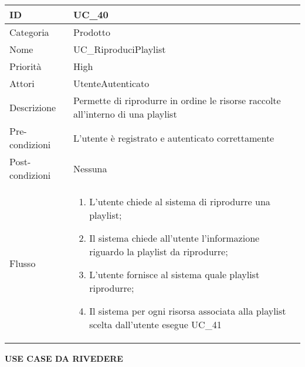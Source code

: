 \begin{center}
\begin{tabular}{ |p{2cm}|p{13cm}|  }
\hline
ID & UC\_40\\\hline
Categoria & Prodotto \\\hline
Nome & UC\_RiproduciPlaylist\\\hline
Priorità & High \\\hline
Attori &  UtenteAutenticato \\\hline
Descrizione & Permette di riprodurre in ordine le risorse raccolte all'interno di una playlist\\\hline
Pre-condizioni & L'utente è registrato e autenticato correttamente\\\hline
Post-condizioni & Nessuna\\\hline
Flusso &  	\begin{enumerate}
		\item L'utente chiede al sistema di riprodurre una playlist;
		\item Il sistema chiede all'utente l'informazione riguardo la playlist da riprodurre;
		\item L'utente fornisce al sistema quale playlist riprodurre;
		\item Il sistema per ogni risorsa associata alla playlist scelta dall'utente esegue UC\_41
		\end{enumerate}\\\hline
\end{tabular}
\label{table_use_case:40}\newline


\textbf{USE CASE DA RIVEDERE} \newline



\end{center}
